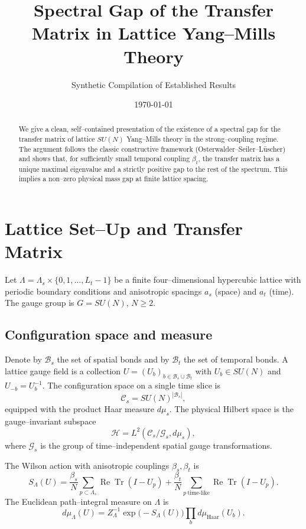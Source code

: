 \documentclass[11pt]{article}
\title{Spectral Gap of the Transfer Matrix in Lattice Yang--Mills Theory}
\author{Synthetic Compilation of Established Results}
\date{\today}
\begin{document}
\maketitle

\begin{abstract}
We give a clean, self--contained presentation of the existence of a spectral
gap for the transfer matrix of lattice $SU(N)$ Yang--Mills theory in the
strong--coupling regime. The argument follows the classic constructive
framework (Osterwalder--Seiler--L\"uscher) and shows that, for sufficiently
small temporal coupling $\beta_t$, the transfer matrix has a unique maximal
eigenvalue and a strictly positive gap to the rest of the spectrum. This
implies a non--zero physical mass gap at finite lattice spacing.
\end{abstract}

\section{Lattice Set--Up and Transfer Matrix}

Let $\Lambda = \Lambda_s \times \{0,1,\dots,L_t-1\}$ be a finite
four--dimensional hypercubic lattice with periodic boundary conditions and
anisotropic spacings $a_s$ (space) and $a_t$ (time). The gauge group is
$G = SU(N)$, $N\ge 2$.

\subsection{Configuration space and measure}

Denote by $\mathcal{B}_s$ the set of spatial bonds and by
$\mathcal{B}_t$ the set of temporal bonds. A lattice gauge field is a
collection $U = (U_b)_{b\in\mathcal{B}_s\cup\mathcal{B}_t}$ with
$U_b \in SU(N)$ and $U_{-b} = U_b^{-1}$. The configuration space on a
single time slice is
\[
  \mathcal{C}_s = SU(N)^{|\mathcal{B}_s|},
\]
equipped with the product Haar measure $d\mu_s$. The physical Hilbert
space is the gauge--invariant subspace
\[
  \mathcal{H} = L^2(\mathcal{C}_s/\mathcal{G}_s,d\mu_s),
\]
where $\mathcal{G}_s$ is the group of time--independent spatial gauge
transformations.

The Wilson action with anisotropic couplings $\beta_s,\beta_t$ is
\begin{equation}
  S_\Lambda(U)
  = \frac{\beta_s}{N}\sum_{p\subset\Lambda_s}
      \operatorname{Re}\operatorname{Tr}(I-U_p)
    + \frac{\beta_t}{N}\sum_{p\ \text{time-like}}
      \operatorname{Re}\operatorname{Tr}(I-U_p).
\end{equation}
The Euclidean path--integral measure on $\Lambda$ is
\[
  d\mu_\Lambda(U) = Z_\Lambda^{-1}
    \exp\big(-S_\Lambda(U)\big)\prod_{b} d\mu_{\text{Haar}}(U_b).
\]
\end{document}
